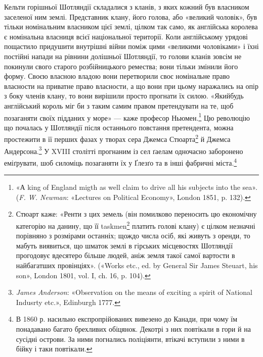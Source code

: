 Кельти горішньої Шотляндії складалися з кланів, з яких
кожний був власником заселеної ним землі. Представник клану,
його голова, або «великий чоловік», був тільки номінальним власником цієї землі,
цілком так само, як англійська королева є номінальна власниця всієї
національної території. Коли англійському урядові пощастило придушити
внутрішні війни поміж цими «великими чоловіками» і їхні
постійні напади на рівнини долішньої Шотляндії, то голови кланів
зовсім не покинули свого старого розбійницького ремества;
вони тільки змінили його форму. Своєю власною владою вони перетворили своє
номінальне право власности на приватне право власности,
а що вони при цьому наражались на опір з боку членів клану, то вони
вирішили просто прогнати їх силою. «Якийбудь англійський король міг би з
таким самим правом претендувати на те, щоб позаганяти своїх підданих у море»
— каже професор Ньюмен.\footnote{
«А king of England migth as well claim to drive all his subjects into the sea».
(\emph{F. W. Newman}: «Lectures on Political Economy», London 1851, p. 132).
} Цю революцію що почалась у Шотляндії після останнього повстання претендента,
можна простежити в її перших фазах у творах сера Джемса Стюарта\footnote{
Стюарт каже: «Ренти з цих земель (він помилково переносить цю економічну
категорію на данину, що її taskmen\footnote*{
— васаль. \emph{Ред.}
} платить голові клану) є цілком незначні порівняно з розмірами останніх;
щождо числа осіб, які живуть з оренди, то мабуть виявиться, що шматок
землі в гірських місцевостях Шотляндії прогодовує вдесятеро більше людей,
аніж земля такої самої вартости в найбагатших провінціях».
(«Works etc., ed. by General Sir James Steuart, his son», London 1801, vol. I,
ch. 16, p. 104).
} й Джемса Андерсона.\footnote{
\emph{James Anderson}: «Observation on the means of exciting a spirit of
National Indusrty etc.», Edinburgh 1777.
} У XVIII столітті
прогнаним із сел ґаелам одночасно заборонено еміґрувати,
шоб силоміць позаганяти їх у Ґлезґо та в інші фабричні міста.\footnote{
В 1860 р. насильно експропрійованих вивезено до Канади, при
чому їм понадавано багато брехливих обіцянок. Декотрі з них повтікали
в гори й на сусідні острови. За ними погнались поліціянти, втікачі вступили
з ними в бійку і таки повтікали.
}
